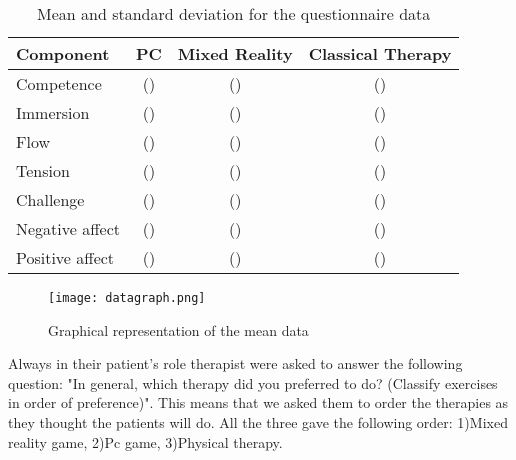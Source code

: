 \documentclass[preprint,authoryear,12pt]{elsarticle}
\begin{document}
\begin{table}[h]
\caption{Mean and standard deviation for the questionnaire data}
\center
\label{fig:fuma}
\begin{tabular}{|l|c|c|c|}
\hline
Component & PC & Mixed Reality & Classical Therapy \\
\hline
Competence & 	() & 	() & 	() \\
Immersion & 	() & 	() & 	() \\
Flow & 		() & 	() & 	()\\
Tension & 		() & 	() & 	() \\
Challenge & 	() & 	() & 	() \\
Negative affect&	() & 		() & 		() \\
Positive affect &	() & 	() & 	() \\
\hline
\end{tabular}
\end{table}




\begin{figure}[h]
	\centering
		\texttt{[image: datagraph.png]}
	\caption{Graphical representation of the mean data}
	\label{fig:graph}
\end{figure}


Always in their patient's role therapist were asked to answer the following question: "In general, which therapy did you preferred to do? (Classify exercises in order of preference)".	
This means that we asked them to order the therapies as they thought the patients will do.
All the three gave the following order: 1)Mixed reality game,  2)Pc game,	3)Physical therapy.
\end{document}
